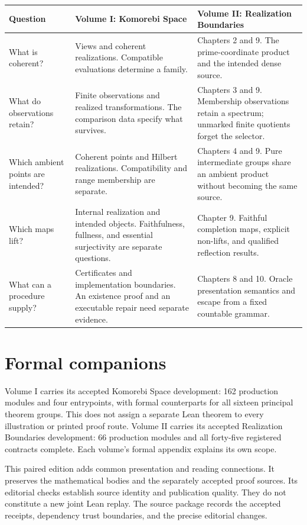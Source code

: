 \begingroup\small\setlength{\tabcolsep}{5pt}\renewcommand{\arraystretch}{1.25}
\noindent\begin{tabularx}{\linewidth}{@{}p{.20\linewidth}XX@{}}
\toprule
\textbf{Question}&\textbf{Volume I: Komorebi Space}&\textbf{Volume II: Realization Boundaries}\\
\midrule
What is coherent?&Views and coherent realizations. Compatible evaluations determine a family.&Chapters 2 and 9. The prime-coordinate product and the intended dense source.\\
What do observations retain?&Finite observations and realized transformations. The comparison data specify what survives.&Chapters 3 and 9. Membership observations retain a spectrum; unmarked finite quotients forget the selector.\\
Which ambient points are intended?&Coherent points and Hilbert realizations. Compatibility and range membership are separate.&Chapters 4 and 9. Pure intermediate groups share an ambient product without becoming the same source.\\
Which maps lift?&Internal realization and intended objects. Faithfulness, fullness, and essential surjectivity are separate questions.&Chapter 9. Faithful completion maps, explicit non-lifts, and qualified reflection results.\\
What can a procedure supply?&Certificates and implementation boundaries. An existence proof and an executable repair need separate evidence.&Chapters 8 and 10. Oracle presentation semantics and escape from a fixed countable grammar.\\
\bottomrule
\end{tabularx}\endgroup

\section*{Formal companions}
Volume I carries its accepted Komorebi Space development: 162 production modules and four entrypoints, with formal counterparts for all sixteen principal theorem groups. This does not assign a separate Lean theorem to every illustration or printed proof route. Volume II carries its accepted Realization Boundaries development: 66 production modules and all forty-five registered contracts complete. Each volume's formal appendix explains its own scope.

This paired edition adds common presentation and reading connections. It preserves the mathematical bodies and the separately accepted proof sources. Its editorial checks establish source identity and publication quality. They do not constitute a new joint Lean replay. The source package records the accepted receipts, dependency trust boundaries, and the precise editorial changes.
\clearpage
